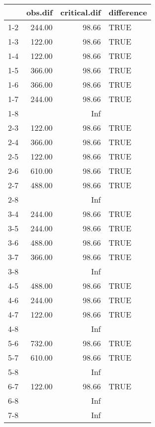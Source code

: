 \begin{table}[ht]
\centering
\begin{tabular}{rrrl}
  \hline
 & obs.dif & critical.dif & difference \\ 
  \hline
1-2 & 244.00 & 98.66 & TRUE \\ 
  1-3 & 122.00 & 98.66 & TRUE \\ 
  1-4 & 122.00 & 98.66 & TRUE \\ 
  1-5 & 366.00 & 98.66 & TRUE \\ 
  1-6 & 366.00 & 98.66 & TRUE \\ 
  1-7 & 244.00 & 98.66 & TRUE \\ 
  1-8 &  & Inf &  \\ 
  2-3 & 122.00 & 98.66 & TRUE \\ 
  2-4 & 366.00 & 98.66 & TRUE \\ 
  2-5 & 122.00 & 98.66 & TRUE \\ 
  2-6 & 610.00 & 98.66 & TRUE \\ 
  2-7 & 488.00 & 98.66 & TRUE \\ 
  2-8 &  & Inf &  \\ 
  3-4 & 244.00 & 98.66 & TRUE \\ 
  3-5 & 244.00 & 98.66 & TRUE \\ 
  3-6 & 488.00 & 98.66 & TRUE \\ 
  3-7 & 366.00 & 98.66 & TRUE \\ 
  3-8 &  & Inf &  \\ 
  4-5 & 488.00 & 98.66 & TRUE \\ 
  4-6 & 244.00 & 98.66 & TRUE \\ 
  4-7 & 122.00 & 98.66 & TRUE \\ 
  4-8 &  & Inf &  \\ 
  5-6 & 732.00 & 98.66 & TRUE \\ 
  5-7 & 610.00 & 98.66 & TRUE \\ 
  5-8 &  & Inf &  \\ 
  6-7 & 122.00 & 98.66 & TRUE \\ 
  6-8 &  & Inf &  \\ 
  7-8 &  & Inf &  \\ 
   \hline
\end{tabular}
\end{table}
